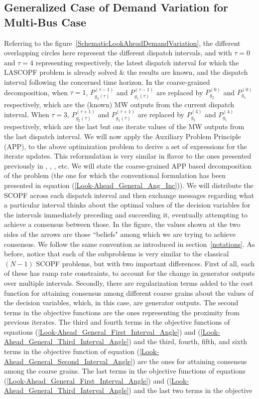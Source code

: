 \documentclass[preprint,12pt,3p]{elsarticle}
\begin{document}
\subsection{Generalized Case of Demand Variation for Multi-Bus Case}
\label{APP_Demand_Variation_General}
Referring to the figure~\ref{SchematicLookAheadDemandVariation}, the different overlapping circles here represent the different dispatch intervals, and with $\tau=0$ and $\tau=4$ representing respectively, the latest dispatch interval for which the LASCOPF problem is already solved \& the results are known, and the dispatch interval following the concerned time horizon. In the coarse-grained decomposition, when $\tau = 1$, $P_{g_2(\tau)}^{(\tau-1)}$ and $P_{g_1(\tau)}^{(\tau-1)}$ are replaced by $P_{g_2}^{(0)}$ and $P_{g_1}^{(0)}$ respectively, which are the (known) MW outputs from the current dispatch interval. When $\tau = 3$, $P_{g_2(\tau)}^{(\tau+1)}$ and $P_{g_1(\tau)}^{(\tau+1)}$ are replaced by $P_{g_2}^{(4)}$ and $P_{g_1}^{(4)}$ respectively, which are the last but one iterate values of the MW outputs from the last dispatch interval. We will now apply the Auxiliary Problem Principle (APP)\cite{Cohen:78},  \cite{Cohen:80} to the above optimization problem to derive a set of expressions for the iterate updates. This reformulation is very similar in flavor to the ones presented previously in \cite{KB:97}, \cite{BKCL:99}, \cite{EbrBald:2000}, \cite{BatRen:92} etc. We will state the coarse-grained APP based decomposition of the problem (the one for which the conventional formulation has been presented in equation (\ref{Look-Ahead_General_Ang_Inc})). We will distribute the SCOPF across each dispatch interval and then exchange messages regarding what a particular interval thinks about the optimal values of the decision variables for the intervals immediately preceding and succeeding it, eventually attempting to achieve a consensus between those. In the figure, the values shown at the two sides of the arrows are those ``beliefs" among which we are trying to achieve consensus. We follow the same convention as introduced in section~\ref{notations}. As before, notice that each of the subproblems is very similar to the classical $(N-1)$ SCOPF problems, but with two important differences. First of all, each of these has ramp rate constraints, to account for the change in generator outputs over multiple intervals. Secondly, there are regularization terms added to the cost function for attaining consensus among different coarse grains about the values of the decision variables, which, in this case, are generator outputs. The second terms in the objective functions are the ones representing the proximity from previous iterates. The third and fourth terms in the objective functions of equations (\ref{Look-Ahead_General_First_Interval_Angle}) and (\ref{Look-Ahead_General_Third_Interval_Angle}) and the third, fourth, fifth, and sixth terms in the objective function of equation (\ref{Look-Ahead_General_Second_Interval_Angle}) are the ones for attaining consensus among the coarse grains. The last terms in the objective functions of equations (\ref{Look-Ahead_General_First_Interval_Angle}) and (\ref{Look-Ahead_General_Third_Interval_Angle}) and the last two terms in the objective 
\end{document}
